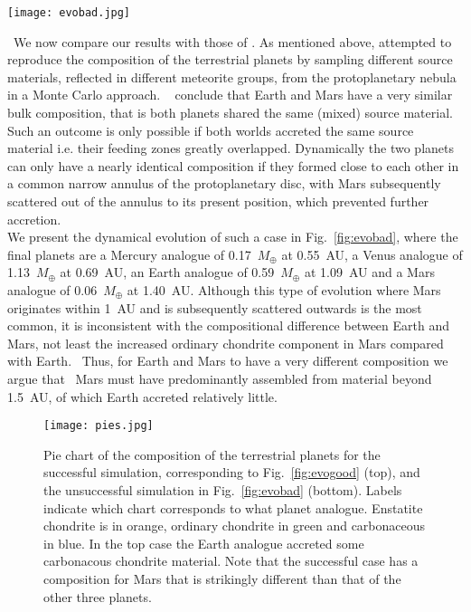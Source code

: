 \documentclass[preprint,5p,times,authoryear]{elsarticle}
\begin{document}
\begin{figure*}[ht!]
\texttt{[image: evobad.jpg]}
\caption{Same as Fig.~\ref{fig:evogood} but now we show a case where the composition of the Mars analogue is nearly identical to that 
of the Earth analogue because they sample the same region of the protoplanetary disc.}
\label{fig:evobad}
\end{figure*}
{\ We now compare our results with those of \citet{FB16}.} As mentioned above, \citet{FB16} attempted to reproduce the composition 
of the terrestrial planets by sampling different source materials, reflected in different meteorite groups, from the protoplanetary 
nebula in a Monte Carlo approach. {\ \citet{FB16} conclude that Earth and Mars have a very similar bulk composition, that is both 
planets shared the same (mixed) source material. Such an outcome is only possible if both worlds accreted the same source material 
i.e. 
their feeding zones greatly overlapped. Dynamically the two planets can only have a nearly identical composition if they} formed close 
to each other in a common narrow annulus of the protoplanetary disc, with Mars subsequently scattered out of the annulus to its 
present position, which prevented further accretion.\\

We present the dynamical evolution of such a case in Fig.~\ref{fig:evobad}, where the final planets are a Mercury analogue of 
0.17~$M_\oplus$ at 0.55~AU, a Venus analogue of 1.13~$M_\oplus$ at 0.69~AU, an Earth analogue of 0.59~$M_\oplus$ at 1.09~AU and a Mars 
analogue of 0.06~$M_\oplus$ at 1.40~AU. Although this type of evolution where Mars originates within 1~AU and is subsequently 
scattered outwards is the most common, it is inconsistent with the compositional difference between Earth and Mars, not least the 
increased ordinary chondrite component in Mars compared with Earth. {\ Thus, for Earth and Mars to have a very different 
composition} we argue that {\ Mars must have predominantly assembled from material beyond 1.5~AU, of which Earth accreted 
relatively little}.\\

\begin{figure}[ht!]
\texttt{[image: pies.jpg]}
\caption{Pie chart of the composition of the terrestrial planets for the successful simulation, corresponding to  
Fig.~\ref{fig:evogood} (top), and the unsuccessful simulation in Fig.~\ref{fig:evobad} (bottom). Labels indicate which chart 
corresponds to what planet analogue. Enstatite chondrite is in orange, ordinary chondrite in green and carbonaceous in blue. In the 
top case the Earth analogue accreted some carbonacous chondrite material. Note that the successful case has a composition for Mars 
that 
is strikingly different than that of the other three planets.}
\label{fig:pies}
\end{figure}
\end{document}

